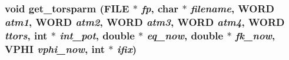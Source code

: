\subsubsection{\setlength{\rightskip}{0pt plus 5cm}void get\_\-torsparm (FILE $\ast$ {\em fp}, char $\ast$ {\em filename}, {\bf WORD} {\em atm1}, {\bf WORD} {\em atm2}, {\bf WORD} {\em atm3}, {\bf WORD} {\em atm4}, {\bf WORD} {\em ttors}, int $\ast$ {\em int\_\-pot}, double $\ast$ {\em eq\_\-now}, double $\ast$ {\em fk\_\-now}, {\bf VPHI} {\em vphi\_\-now}, int $\ast$ {\em ifix})}\label{thomas_2md__getparm_8c_7251b806659f7208ad9e2e6547927ef0}


